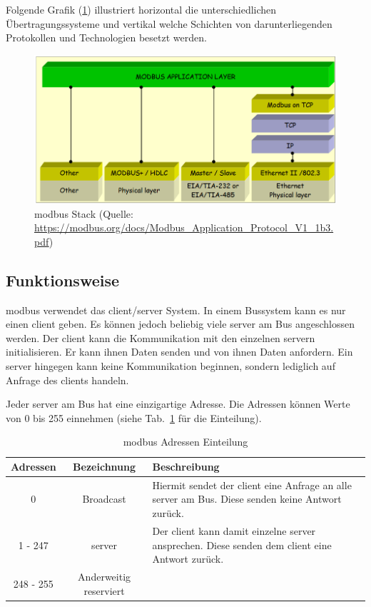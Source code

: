 Folgende Grafik (\ref{fig:modbus_stack}) illustriert horizontal die unterschiedlichen Übertragungssysteme und vertikal welche Schichten von darunterliegenden Protokollen und Technologien besetzt werden.
\begin{figure}[H]
	\centering
	\includegraphics[width=1.0\linewidth]{Bilder/Modbus_layers}
	\caption{\gls{modbus} Stack (Quelle: \url{https://modbus.org/docs/Modbus_Application_Protocol_V1_1b3.pdf})}
	\label{fig:modbus_stack}
\end{figure}

\subsection{Funktionsweise} \label{modbus_funktionsweise}
\gls{modbus} verwendet das \gls{client}/\gls{server} System. In einem Bussystem kann es nur einen \gls{client} geben. Es können jedoch beliebig viele \gls{server} am Bus angeschlossen werden. Der \gls{client} kann die Kommunikation mit den einzelnen \gls{server}n initialisieren. Er kann ihnen Daten senden und von ihnen Daten anfordern. Ein \gls{server} hingegen kann keine Kommunikation beginnen, sondern lediglich auf Anfrage des \gls{client}s handeln.

Jeder \gls{server} am Bus hat eine einzigartige Adresse. Die Adressen können Werte von 0 bis 255 einnehmen (siehe Tab.~\ref{tab:modbus_adressen} für die Einteilung). 
\begin{table}[h]
	\caption{\gls{modbus} Adressen Einteilung \label{tab:modbus_adressen}}
	\begin{tabularx}{\textwidth}{@{}c|c|X@{}}
		\toprule
		\textbf{Adressen} & \textbf{Bezeichnung} & \textbf{Beschreibung} \\
		\midrule
		0 & Broadcast & Hiermit sendet der \gls{client} eine Anfrage an alle \gls{server} am Bus. Diese senden keine Antwort zurück. \\
		1 - 247 & \gls{server} & Der \gls{client} kann damit einzelne \gls{server} ansprechen. Diese senden dem \gls{client} eine Antwort zurück. \\
		248 - 255 & Anderweitig reserviert & \\
		\bottomrule
	\end{tabularx}
\end{table}

